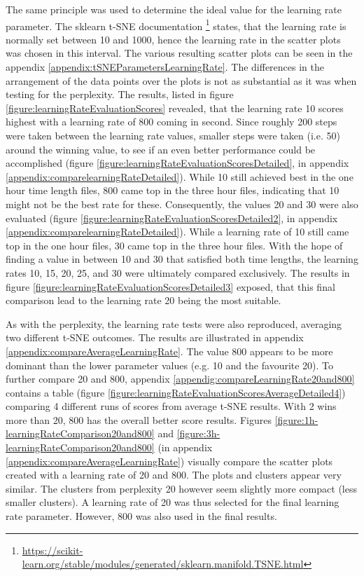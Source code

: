 The same principle was used to determine the ideal value for the learning rate parameter. The sklearn t-SNE documentation \footnote{\url{https://scikit-learn.org/stable/modules/generated/sklearn.manifold.TSNE.html}} states, that the learning rate is normally set between 10 and 1000, hence the learning rate in the scatter plots was chosen in this interval.
The various resulting scatter plots can be seen in the appendix \ref{appendix:tSNEParametersLearningRate}. The differences in the arrangement of the data points over the plots is not as substantial as it was when testing for the perplexity. The results, listed in figure \ref{figure:learningRateEvaluationScores} revealed, that the learning rate 10 scores highest with a learning rate of 800 coming in second. Since roughly 200 steps were taken between the learning rate values, smaller steps were taken (i.e. 50) around the winning value, to see if an even better performance could be accomplished (figure \ref{figure:learningRateEvaluationScoresDetailed}, in appendix \ref{appendix:comparelearningRateDetailed}). While 10 still achieved best in the one hour time length files, 800 came top in the three hour files, indicating that 10 might not be the best rate for these. Consequently, the values 20 and 30 were also evaluated (figure \ref{figure:learningRateEvaluationScoresDetailed2}, in appendix \ref{appendix:comparelearningRateDetailed}). While a learning rate of 10 still came top in the one hour files, 30 came top in the three hour files. With the hope of finding a value in between 10 and 30 that satisfied both time lengths, the learning rates 10, 15, 20, 25, and 30 were ultimately compared exclusively. The results in figure \ref{figure:learningRateEvaluationScoresDetailed3} exposed, that this final comparison lead to the learning rate 20 being the most suitable. 

As with the perplexity, the learning rate tests were also reproduced, averaging two different t-SNE outcomes. The results are illustrated in appendix \ref{appendix:compareAverageLearningRate}. The value 800 appears to be more dominant than the lower parameter values (e.g. 10 and the favourite 20). To further compare 20 and 800, appendix \ref{appendig:compareLearningRate20and800} contains a table (figure \ref{figure:learningRateEvaluationScoresAverageDetailed4}) comparing 4 different runs of scores from average t-SNE results. With 2 wins more than 20, 800 has the overall better score results. Figures \ref{figure:1h-learningRateComparison20and800} and \ref{figure:3h-learningRateComparison20and800} (in appendix \ref{appendix:compareAverageLearningRate}) visually compare the scatter plots created with a learning rate of 20 and 800. The plots and clusters appear very similar. The clusters from perplexity 20 however seem slightly more compact (less smaller clusters). A learning rate of 20 was thus selected for the final learning rate parameter. However, 800 was also used in the final results.


